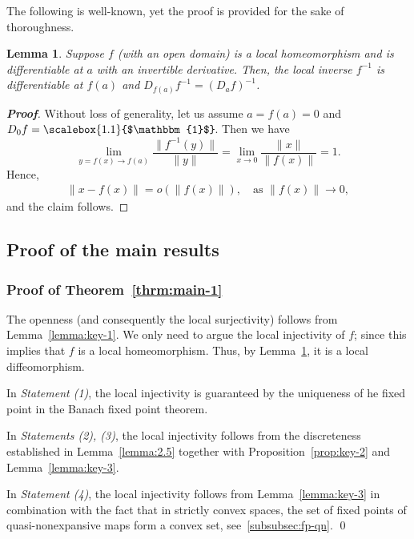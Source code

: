 \documentclass[a4, 12pt,leqno]{amsart}
\theoremstyle{plain}
\newtheorem{lemma}{Lemma}[section]
\theoremstyle{definition}
\theoremstyle{remark}
\numberwithin{equation}{section}
\newcommand{\ident}{\raisebox{0pt}{\scalebox{1.1}{$\mathbbm{1}$}}\hspace{-1pt}}
\begin{document}
\par The following is well-known, yet the proof is provided for the sake of thoroughness. 
\begin{lemma}\label{lemma:key-4}
	Suppose $f$ (with an open domain) is a local homeomorphism and is differentiable at $a$ with an invertible derivative. Then, the local inverse $f^{-1}$ is differentiable at $f(a)$ and $D_{f(a)}f^{-1} = (D_af)^{-1}$. 
\end{lemma}
\begin{proof}[\footnotesize \textbf{Proof}]
	Without loss of generality, let us assume $a=f(a)= 0$ and $D_0f = \ident$. Then we have
	\[
	\lim_{y=f(x) \to f(a)}\frac{\|f^{-1}(y)\|}{\|y\|}=\lim_{x \to 0} \frac{\|x\|}{\|f(x)\|} = 1.
	\]
	Hence,
	\begin{align}
		\|x - f(x)\| = o(\|f(x)\|), \quad \text{as $\|f(x)\| \to 0$},
	\end{align}	
	and the claim follows. 
\end{proof}
\subsection{Proof of the main results}
\subsubsection{\small \textbf{\textsf{Proof of Theorem~\ref{thrm:main-1}}}}
\par The openness (and consequently the local surjectivity) follows from Lemma~\ref{lemma:key-1}. We only need to argue the local injectivity of $f$; since this implies that $f$ is a local homeomorphism. Thus, by Lemma~\ref{lemma:key-4}, it is a local diffeomorphism. 
\par In \emph{\small Statement (1)}, the local injectivity is guaranteed by the uniqueness of he fixed point in the Banach fixed point theorem. 
\par In \emph{\small Statements (2), (3)}, the local injectivity follows from the discreteness established in Lemma~\ref{lemma:2.5} together with Proposition~\ref{prop:key-2} and Lemma~\ref{lemma:key-3}.
\par In \emph{\small Statement (4)}, the local injectivity follows from Lemma~\ref{lemma:key-3} in combination with the fact that in strictly convex spaces, the set of fixed points of quasi-nonexpansive maps form a convex set, see~\textsection\thinspace\ref{subsubsec:fp-qn}. 
\qed
\end{document}
